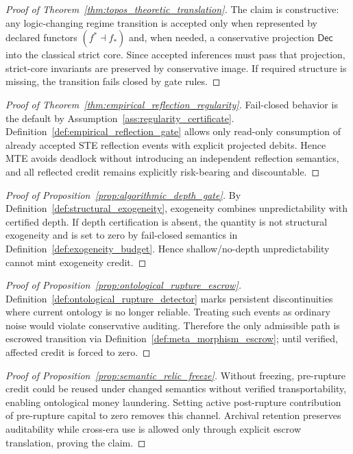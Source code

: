\documentclass[11pt]{article}
\theoremstyle{definition}
\theoremstyle{plain}
\newcommand{\STE}{\textsf{STE}}
\newcommand{\MTE}{\textsf{MTE}}
\begin{document}
\begin{proof}[Proof of Theorem~\ref{thm:topos_theoretic_translation}]
The claim is constructive: any logic-changing regime transition is accepted only when represented by declared functors $(f^\ast\dashv f_\ast)$ and, when needed, a conservative projection $\mathsf{Dec}$ into the classical strict core.
Since accepted inferences must pass that projection, strict-core invariants are preserved by conservative image.
If required structure is missing, the transition fails closed by gate rules.
\end{proof}

\begin{proof}[Proof of Theorem~\ref{thm:empirical_reflection_regularity}]
Fail-closed behavior is the default by Assumption~\ref{ass:regularity_certificate}.
Definition~\ref{def:empirical_reflection_gate} allows only read-only consumption of already accepted \STE{} reflection events with explicit projected debits.
Hence \MTE{} avoids deadlock without introducing an independent reflection semantics, and all reflected credit remains explicitly risk-bearing and discountable.
\end{proof}

\begin{proof}[Proof of Proposition~\ref{prop:algorithmic_depth_gate}]
By Definition~\ref{def:structural_exogeneity}, exogeneity combines unpredictability with certified depth.
If depth certification is absent, the quantity is not structural exogeneity and is set to zero by fail-closed semantics in Definition~\ref{def:exogeneity_budget}.
Hence shallow/no-depth unpredictability cannot mint exogeneity credit.
\end{proof}

\begin{proof}[Proof of Proposition~\ref{prop:ontological_rupture_escrow}]
Definition~\ref{def:ontological_rupture_detector} marks persistent discontinuities where current ontology is no longer reliable.
Treating such events as ordinary noise would violate conservative auditing.
Therefore the only admissible path is escrowed transition via Definition~\ref{def:meta_morphism_escrow}; until verified, affected credit is forced to zero.
\end{proof}

\begin{proof}[Proof of Proposition~\ref{prop:semantic_relic_freeze}]
Without freezing, pre-rupture credit could be reused under changed semantics without verified transportability, enabling ontological money laundering.
Setting active post-rupture contribution of pre-rupture capital to zero removes this channel.
Archival retention preserves auditability while cross-era use is allowed only through explicit escrow translation, proving the claim.
\end{proof}
\end{document}
